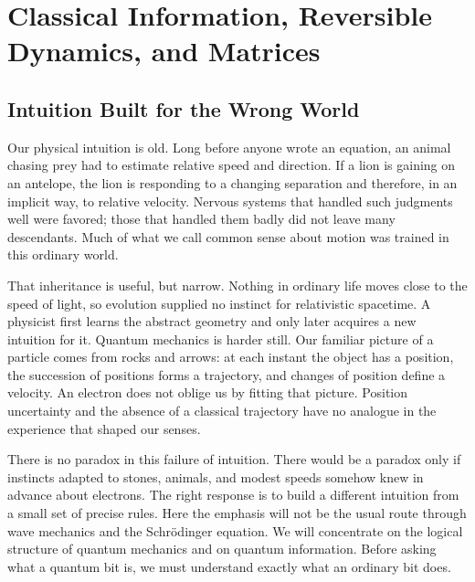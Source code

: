 \chapter{Classical Information, Reversible Dynamics, and Matrices}


\section{Intuition Built for the Wrong World}

Our physical intuition is old. Long before anyone wrote an equation, an animal chasing prey had to estimate relative speed and direction. If a lion is gaining on an antelope, the lion is responding to a changing separation and therefore, in an implicit way, to relative velocity. Nervous systems that handled such judgments well were favored; those that handled them badly did not leave many descendants. Much of what we call common sense about motion was trained in this ordinary world.

That inheritance is useful, but narrow. Nothing in ordinary life moves close to the speed of light, so evolution supplied no instinct for relativistic spacetime. A physicist first learns the abstract geometry and only later acquires a new intuition for it. Quantum mechanics is harder still. Our familiar picture of a particle comes from rocks and arrows: at each instant the object has a position, the succession of positions forms a trajectory, and changes of position define a velocity. An electron does not oblige us by fitting that picture. Position uncertainty and the absence of a classical trajectory have no analogue in the experience that shaped our senses.

There is no paradox in this failure of intuition. There would be a paradox only if instincts adapted to stones, animals, and modest speeds somehow knew in advance about electrons. The right response is to build a different intuition from a small set of precise rules. Here the emphasis will not be the usual route through wave mechanics and the Schr\"odinger equation. We will concentrate on the logical structure of quantum mechanics and on quantum information. Before asking what a quantum bit is, we must understand exactly what an ordinary bit does.

